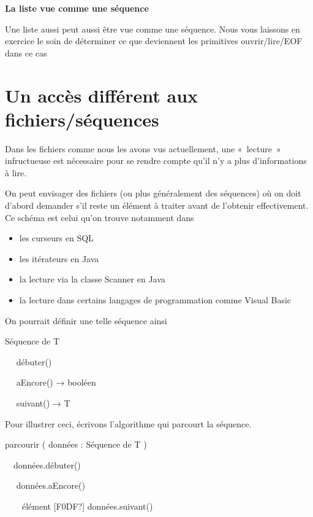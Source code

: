 {\sffamily\bfseries\upshape
La liste vue comme une séquence}

{
Une liste aussi peut aussi être vue comme une séquence. Nous vous
laissons en exercice le soin de déterminer ce que deviennent les
primitives ouvrir/lire/\textsf{EOF} dans ce cas}

\section{Un accès différent aux fichiers/séquences}
{
Dans les fichiers comme nous les avons vus actuellement, une «~lecture~»
infructueuse est nécessaire pour se rendre compte
qu'il n'y a plus
d'informations à lire. }

{
On peut envisager des fichiers (ou plus généralement des séquences) où
on doit d'abord demander s'il reste
un élément à traiter avant de l'obtenir effectivement.
Ce schéma est celui qu'on trouve notamment dans }

\liststyleListv
\begin{itemize}
\item {
les curseurs en SQL}
\item {
les itérateurs en Java}
\item {
la lecture via la classe Scanner en Java}
\item {
la lecture dans certains langages de programmation comme Visual Basic}
\end{itemize}
{
On pourrait définir une telle séquence ainsi}

{\sffamily
{} Séquence de T}

{\sffamily
\ \  débuter()\ \ \ \ }

{\sffamily
\ \  aEncore() {→}
booléen}

{\sffamily
\ \  suivant() {→} T}

{\sffamily
{} }

{
Pour illustrer ceci, écrivons l'algorithme qui parcourt
la séquence.}

{\sffamily
{} parcourir ( données : Séquence de T )}

{\sffamily
\ \ données.débuter()}

{\sffamily
\ \   données.aEncore()
}

{\sffamily
\ \ \ \ élément {\textrm{[F0DF?]}}
données.suivant()}

